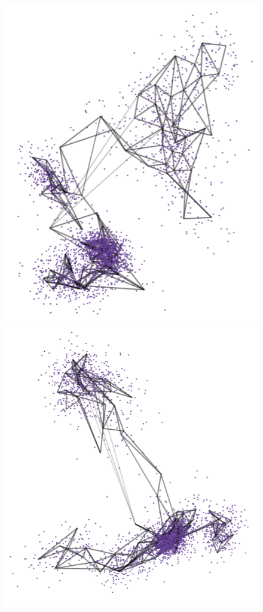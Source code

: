 \documentclass[
  12pt]{article}
\begin{document}
\begin{figure}[H]

\begin{minipage}{0.33\linewidth}
\includegraphics{figures/pbmc3k/sc_4.png}\end{minipage}%
%
\begin{minipage}{0.33\linewidth}
\includegraphics{figures/pbmc3k/sc_5.png}\end{minipage}%

\end{figure}
\end{document}
